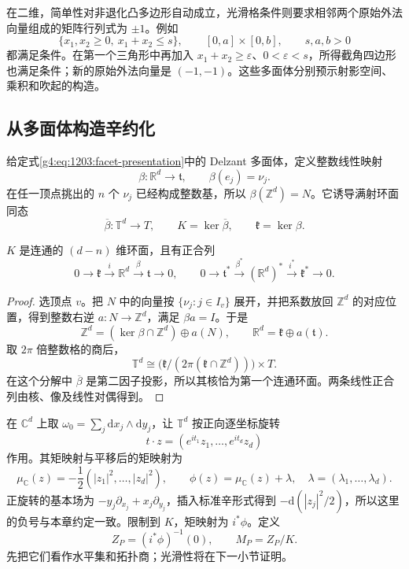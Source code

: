 \ProseParagraphBreak

在二维，简单性对非退化凸多边形自动成立，光滑格条件则要求相邻两个原始外法向量组成的矩阵行列式为 \(\pm1\)。例如
\[
	\{x_1,x_2\ge0,\ x_1+x_2\le s\},\qquad
	[0,a]\times[0,b],\qquad s,a,b>0
\]
都满足条件。在第一个三角形中再加入 \(x_1+x_2\ge\varepsilon\)、\(0<\varepsilon<s\)，所得截角四边形也满足条件；新的原始外法向量是 \((-1,-1)\)。这些多面体分别预示射影空间、乘积和吹起的构造。



\subsection{从多面体构造辛约化}
\label{g4:subsec:1203:02}

给定式\eqref{g4:eq:1203:facet-presentation}中的 Delzant 多面体，定义整数线性映射
\begin{equation}\label{g4:eq:1203:normal-map}
	\beta:\mathbb R^d\longrightarrow\mathfrak t,\qquad
	\beta(e_j)=\nu_j.
\end{equation}
在任一顶点挑出的 \(n\) 个 \(\nu_j\) 已经构成整数基，所以
\(\beta(\mathbb Z^d)=N\)。它诱导满射环面同态
\[
	\overline\beta:\mathbb T^d\longrightarrow T,\qquad
	K=\ker\overline\beta,\qquad \mathfrak k=\ker\beta.
\]

\begin{lemma}\label{g4:lem:1203:kernel-torus}
	\(K\) 是连通的 \((d-n)\) 维环面，且有正合列
	\[
		0\longrightarrow\mathfrak k
		\xrightarrow{\ i\ }\mathbb R^d
		\xrightarrow{\ \beta\ }\mathfrak t\longrightarrow0,
		\qquad
		0\longrightarrow\mathfrak t^*
		\xrightarrow{\ \beta^*\ }(\mathbb R^d)^*
		\xrightarrow{\ i^*\ }\mathfrak k^*\longrightarrow0.
	\]
\end{lemma}
\begin{proof}
	选顶点 \(v\)。把 \(N\) 中的向量按 \(\{\nu_j:j\in I_v\}\) 展开，并把系数放回 \(\mathbb Z^d\) 的对应位置，得到整数右逆 \(a:N\to\mathbb Z^d\)，满足 \(\beta a=I\)。于是
	\[
		\mathbb Z^d=(\ker\beta\cap\mathbb Z^d)\oplus a(N),
		\qquad
		\mathbb R^d=\mathfrak k\oplus a(\mathfrak t).
	\]
	取 \(2\pi\) 倍整数格的商后，
	\[
		\mathbb T^d\cong
		\bigl(\mathfrak k/(2\pi(\mathfrak k\cap\mathbb Z^d))\bigr)\times T.
	\]
	在这个分解中 \(\overline\beta\) 是第二因子投影，所以其核恰为第一个连通环面。两条线性正合列由核、像及线性对偶得到。
\end{proof}

在 \(\mathbb C^d\) 上取 \(\omega_0=\sum_j\mathrm{d}x_j\wedge\mathrm{d}y_j\)，让 \(\mathbb T^d\) 按正向逐坐标旋转
\[
	t\cdot z=(e^{it_1}z_1,\ldots,e^{it_d}z_d)
\]
作用。其矩映射与平移后的矩映射为
\[
	\mu_{\mathbb C}(z)=-\frac12(|z_1|^2,\ldots,|z_d|^2),\qquad
	\phi(z)=\mu_{\mathbb C}(z)+\lambda,\quad
	\lambda=(\lambda_1,\ldots,\lambda_d).
\]
正旋转的基本场为 \(-y_j\partial_{x_j}+x_j\partial_{y_j}\)，插入标准辛形式得到
\(-\mathrm{d}(|z_j|^2/2)\)，所以这里的负号与本章约定一致。限制到 \(K\)，矩映射为 \(i^*\phi\)。定义
\begin{equation}\label{g4:eq:1203:delzant-level}
	Z_P=(i^*\phi)^{-1}(0),\qquad M_P=Z_P/K.
\end{equation}
先把它们看作水平集和拓扑商；光滑性将在下一小节证明。

